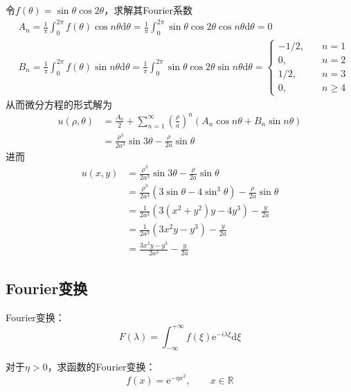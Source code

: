 \documentclass[lang = cn, scheme = chinese, thmcnt = section]{elegantbook}
\newcommand{\R}{\mathbb{R}}            %
\newcommand{\dd}{\mathrm{d}}           %
\newcommand{\ee}[1]{\mathrm{e}^{#1}}   %
\begin{document}
\begin{solution}
	令$f(\theta)=\sin\theta\cos2\theta$，求解其Fourier系数
	\begin{align*}
		& A_n
		=\frac{1}{\pi}\int_{0}^{2\pi}f(\theta)\cos n \theta\dd \theta
		=\frac{1}{\pi}\int_{0}^{2\pi}\sin\theta\cos2\theta\cos n \theta\dd\theta
		=0\\
		& B_n
		=\frac{1}{\pi}\int_{0}^{2\pi}f(\theta)\sin n\theta\dd\theta
		=\frac{1}{\pi}\int_{0}^{2\pi}\sin\theta\cos2\theta\sin n\theta\dd \theta
		=\begin{cases}
			-1/2,\quad & n = 1\\
			0,\quad & n = 2\\
			1/2,\quad & n = 3\\
			0,\quad & n\ge 4
		\end{cases}
	\end{align*}
	从而微分方程的形式解为
	\begin{align*}
		u(\rho,\theta)
		& = \frac{A_0}{2}+\sum_{n=1}^{\infty}\left(\frac{\rho}{a}\right)^n\left(A_n\cos n\theta+B_n\sin n\theta\right)\\
		& =\frac{\rho^3}{2a^3}\sin 3\theta-\frac{\rho}{2a}\sin \theta
	\end{align*}
	进而
	\begin{align*}
		u(x,y)
		& =\frac{\rho^3}{2a^3}\sin 3\theta-\frac{\rho}{2a}\sin \theta\\
		& =\frac{\rho^3}{2a^3}(3\sin\theta-4\sin^3\theta)-\frac{\rho}{2a}\sin \theta\\
		& =\frac{1}{2a^3}(3(x^2+y^2)y-4y^3)-\frac{y}{2a}\\
		& = \frac{1}{2a^3}(3x^2y-y^3)-\frac{y}{2a}\\
		& = \frac{3x^2y-y^3}{2a^3}-\frac{y}{2a}
	\end{align*}
\end{solution}

\subsection{Fourier变换}

\begin{note}
	Fourier变换：%
	$$
	F(\lambda)=\int_{-\infty}^{+\infty}f(\xi)\ee{-i\lambda\xi}\dd\xi
	$$
\end{note}

\begin{example}
	对于$\eta>0$，求函数的Fourier变换：
	$$
	f(x)=\text{e}^{-\eta x^2},\qquad x\in\R
	$$
\end{example}
\end{document}
